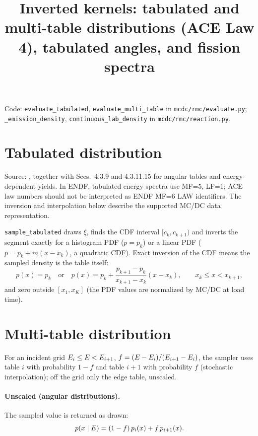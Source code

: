 \documentclass[11pt]{article}
\title{Inverted kernels: tabulated and multi-table distributions (ACE Law 4),
tabulated angles, and fission spectra}
\date{}
\begin{document}
\maketitle

\noindent Code: \texttt{evaluate\_tabulated}, \texttt{evaluate\_multi\_table} in
\texttt{mcdc/rmc/evaluate.py}; \texttt{\_emission\_density},
\texttt{continuous\_lab\_density} in \texttt{mcdc/rmc/reaction.py}.

\section{Tabulated distribution}

\noindent Source: , together with Secs.~4.3.9 and 4.3.11.15
for angular tables and energy-dependent yields. In ENDF, tabulated energy
spectra use MF=5, LF=1; ACE law numbers should not be interpreted as
ENDF MF=6 LAW identifiers. The inversion and interpolation below describe
the supported MC/DC data representation.

\texttt{sample\_tabulated} draws $\xi$, finds the CDF interval $[c_k, c_{k+1})$ and
inverts the segment exactly for a histogram PDF ($p = p_k$) or a linear PDF
($p = p_k + m(x - x_k)$, a quadratic CDF). Exact inversion of the CDF means the sampled
density is the table itself:
\begin{equation}
  p(x) = p_k \quad\text{or}\quad p(x) = p_k + \frac{p_{k+1}-p_k}{x_{k+1}-x_k}(x - x_k),
  \qquad x_k \le x < x_{k+1},
\end{equation}
and zero outside $[x_1, x_K]$ (the PDF values are normalized by MC/DC at load time).

\section{Multi-table distribution}

For an incident grid $E_i \le E < E_{i+1}$, $f = (E - E_i)/(E_{i+1}-E_i)$, the
sampler uses table $i$ with probability $1-f$ and table $i+1$ with probability $f$
(stochastic interpolation); off the grid only the edge table, unscaled.

\paragraph{Unscaled (angular distributions).} The sampled value is returned as drawn:
\begin{equation}
  p(x \mid E) = (1-f)\,p_i(x) + f\,p_{i+1}(x).
\end{equation}
\end{document}
